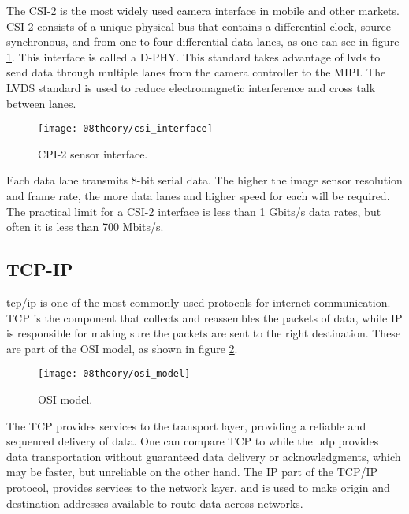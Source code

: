 The CSI-2 is the most widely used camera interface in mobile and other markets. CSI-2 consists of a unique physical bus that contains a differential clock, source synchronous, and from one to four differential data lanes, as one can see in figure \ref{fig:csi_interface}. This interface is called a D-PHY. This standard takes advantage of \ac{lvds} to send data through multiple lanes from the camera controller to the MIPI. The LVDS standard is used to reduce electromagnetic interference and cross talk between lanes.

\begin{figure}[H]
	\centering
	\texttt{[image: 08theory/csi\_interface]}
	\caption{CPI-2 sensor interface.}
	\label{fig:csi_interface}
\end{figure}

Each data lane transmits 8-bit serial data. The higher the image sensor resolution and frame rate, the more data lanes and higher speed for each will be required. The practical limit for a CSI-2 interface is less than 1 Gbits/s data rates, but often it is less than 700 Mbits/s. \cite{csi_interface}

\clearpage
\subsection{TCP-IP}
\ac{tcp}/\ac{ip} is one of the most commonly used protocols for internet communication. TCP is the component that collects and reassembles the packets of data, while IP is responsible for making sure the packets are sent to the right destination. These are part of the OSI model, as shown in figure \ref{fig:osi_model}.

\begin{figure}[H]
	\centering
	\texttt{[image: 08theory/osi\_model]}
	\caption{OSI model.}
	\label{fig:osi_model}
\end{figure}

The TCP provides services to the transport layer, providing a reliable and sequenced delivery of data. One can compare TCP to while the \ac{udp} provides data transportation without guaranteed data delivery or acknowledgments, which may be faster, but unreliable on the other hand. The IP part of the TCP/IP protocol, provides services to the network layer, and is used to make origin and destination addresses available to route data across networks.

\clearpage
